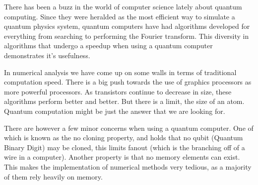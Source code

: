 
There has been a buzz in the world of computer science lately about quantum computing. \cite{sciam}
Since they were heralded as the most efficient way to simulate a quantum physics system, quantum computers have had algorithms developed for everything from searching to performing the Fourier transform. 
This diversity in algorithms that undergo a speedup when using a quantum computer demonstrates it's usefulness. 


In numerical analysis we have come up on some walls in terms of traditional computation speed. 
There is a big push towards the use of graphics processors as more powerful processors. 
As transistors continue to decrease in size, these algorithms perform better and better. 
But there is a limit, the size of an atom. 
Quantum computation might be just the answer that we are looking for. 


There are however a few minor concerns when using a quantum computer. 
One of which is known as the no cloning property, and holds that no qubit (Quantum Binary Digit) may be cloned, this limits fanout (which is the branching off of a wire in a computer). 
Another property is that no memory elements can exist. 
This makes the implementation of numerical methods very tedious, as a majority of them rely heavily on memory.


